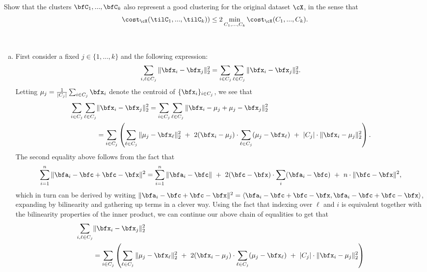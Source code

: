 \begin{homework}[e]
\begin{enumerate}[(a)]
    Show that the clusters $\bfC_1,...,\bfC_k$ also represent a good clustering for the original dataset $\cX$, in the sense that
    \begin{align*}
      \cost_\cX(\tilC_1,...,\tilC_k)) \leq 2 \min_{C_1,...,C_k} \cost_{\cX}(C_1,...,C_k).
    \end{align*}
  \end{enumerate}
  \begin{prf}$ $
    \begin{enumerate}[(a)]
      \item First consider a fixed $j \in \{1,...,k\}$ and the following expression:
        \begin{align*}
          \sum_{i,\ell\in C_j} \|\bfx_i - \bfx_j\|^2_2 = \sum_{i\in C_j}\sum_{\ell \in C_j} \|\bfx_i - \bfx_j\|^2_2.
        \end{align*}
        Letting $\mu_j = \frac{1}{|C_j|}\sum_{i \in C_j}\bfx_i$ denote the centroid of $\{\bfx_i\}_{i \in C_j}$, we see that
        \begin{align*}
          \sum_{i\in C_j}\sum_{\ell \in C_j} &\|\bfx_i - \bfx_j\|^2_2 
            =\sum_{i\in C_j}\sum_{\ell \in C_j} \|\bfx_i - \mu_j + \mu_j - \bfx_j\|^2_2 \\
            &= \sum_{i\in C_j}\left(\sum_{\ell \in C_j}\|\mu_j - \bfx_\ell\|^2_2 ~+~ 2(\bfx_i - \mu_j)\cdot\sum_{\ell \in C_j}(\mu_j - \bfx_\ell) ~+~ |C_j|\cdot \|\bfx_i - \mu_j\|^2_2\right).
        \end{align*}
        The second equality above follows from the fact that
        \begin{align*}
          \sum_{i=1}^n \|\bfa_i - \bfc + \bfc - \bfx\|^2 = \sum_{i=1}^n \|\bfa_i - \bfc\| ~+~ 2(\bfc - \bfx) \cdot \sum_i (\bfa_i - \bfc) ~+~ n\cdot\|\bfc - \bfx\|^2,
        \end{align*}
        which in turn can be derived by writing $\|\bfa_i - \bfc + \bfc - \bfx\|^2 = \langle \bfa_i - \bfc + \bfc - \bfx, \bfa_i - \bfc + \bfc - \bfx\rangle$, expanding by bilinearity and gathering up terms in a clever way. Using the fact that indexing over $\ell$ and $i$ is equivalent together with the bilinearity properties of the inner product, we can continue our above chain of equalities to get that
        \begin{align*}
          \sum_{i,\ell\in C_j} &\|\bfx_i - \bfx_j\|^2_2  \\
            &= \sum_{i\in C_j}\left(\sum_{\ell \in C_j}\|\mu_j - \bfx_\ell\|^2_2 ~+~ 2(\bfx_i - \mu_j)\cdot\sum_{\ell \in C_j}(\mu_j - \bfx_\ell) ~+~ |C_j|\cdot \|\bfx_i - \mu_j\|^2_2\right) \\

\end{align*}
\end{enumerate}
\end{prf}
\end{homework}
